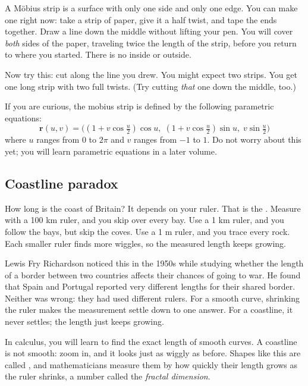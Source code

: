 A M\"obius strip is a surface with only one side and only one edge. You
can make one right now: take a strip of paper, give it a half twist, and
tape the ends together. Draw a line down the middle without lifting your
pen. You will cover \emph{both} sides of the paper, traveling twice the
length of the strip, before you return to where you started. There is no
inside or outside.

Now try this: cut along the line you drew. You might expect two strips.
You get one long strip with two full twists. (Try cutting \emph{that} one
down the middle, too.)

If you are curious, the mobius strip is defined by the following parametric equations:
$$\mathbf{r}(u,v) =
    \bigl(
    (1 + v\cos \tfrac{u}{2})\cos u,\;
    (1 + v\cos \tfrac{u}{2})\sin u,\;
    v\sin \tfrac{u}{2}
    \bigr)$$
where $u$ ranges from $0$ to $2\pi$ and $v$ ranges from $-1$ to $1$. Do not worry about this yet; you will learn parametric equations in a
later volume.
\subsection{Coastline paradox}
How long is the coast of Britain? It depends on your ruler. That is the
. Measure with a
100 km ruler, and you skip over every bay. Use a 1 km ruler, and you follow
the bays, but skip the coves. Use a 1 m ruler, and you trace every rock.
Each smaller ruler finds more wiggles, so the measured length keeps
growing.

Lewis Fry Richardson noticed this in the 1950s while studying whether the
length of a border between two countries affects their chances of going
to war. He found that Spain and Portugal reported very different lengths
for their shared border. Neither was wrong: they had used different
rulers. For a smooth curve, shrinking the ruler makes the measurement
settle down to one answer. For a coastline, it never settles; the length
just keeps growing.


In calculus, you will learn to find the exact length of smooth curves. A
coastline is not smooth: zoom in, and it looks just as wiggly as before.
Shapes like this are called , and mathematicians measure
them by how quickly their length grows as the ruler shrinks, a number
called the \emph{fractal dimension}.


